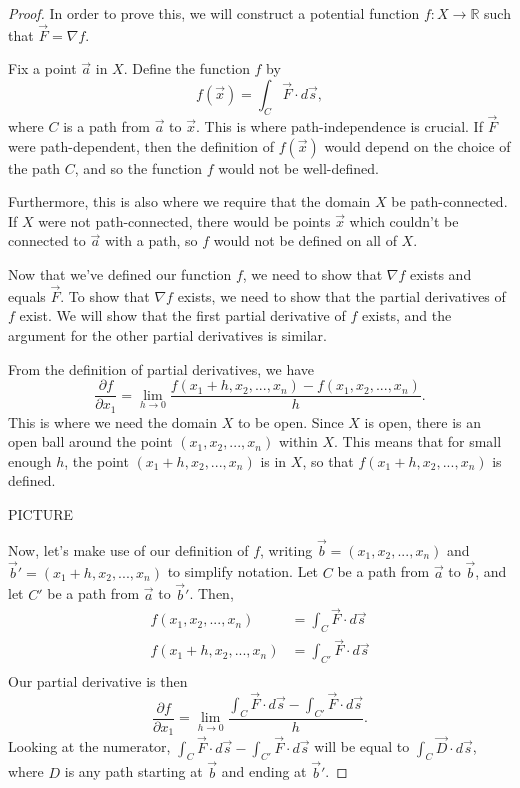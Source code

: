 \documentclass{ximera}
\begin{document}
\begin{proof}
In order to prove this, we will construct a potential function $f:X\rightarrow\mathbb{R}$ such that $\vec{F} = \nabla f$.

Fix a point $\vec{a}$ in $X$. Define the function $f$ by
\[
f(\vec{x}) = \int_C\vec{F}\cdot d\vec{s},
\]
where $C$ is a path from $\vec{a}$ to $\vec{x}$. This is where path-independence is crucial. If $\vec{F}$ were path-dependent, then the definition of $f(\vec{x})$ would depend on the choice of the path $C$, and so the function $f$ would not be well-defined. 

Furthermore, this is also where we require that the domain $X$ be path-connected. If $X$ were not path-connected, there would be points $\vec{x}$ which couldn't be connected to $\vec{a}$ with a path, so $f$ would not be defined on all of $X$.

Now that we've defined our function $f$, we need to show that $\nabla f$ exists and equals $\vec{F}$. To show that $\nabla f$ exists, we need to show that the partial derivatives of $f$ exist. We will show that the first partial derivative of $f$ exists, and the argument for the other partial derivatives is similar.

From the definition of partial derivatives, we have
\[
\frac{\partial f}{\partial x_1} = \lim_{h\rightarrow 0} \frac{f(x_1+h,x_2,...,x_n) - f(x_1,x_2,...,x_n)}{h}.
\]
This is where we need the domain $X$ to be open. Since $X$ is open, there is an open ball around the point $(x_1,x_2,...,x_n)$ within $X$. This means that for small enough $h$, the point $(x_1+h,x_2,...,x_n)$ is in $X$, so that $f(x_1+h,x_2,...,x_n)$ is defined.

PICTURE

Now, let's make use of our definition of $f$, writing $\vec{b} = (x_1,x_2,...,x_n)$ and $\vec{b}' = (x_1+h,x_2,...,x_n)$ to simplify notation. Let $C$ be a path from $\vec{a}$ to $\vec{b}$, and let $C'$ be a path from $\vec{a}$ to $\vec{b}'$. Then,
\begin{align*}
f(x_1,x_2,...,x_n) &= \int_C\vec{F}\cdot d\vec{s}\\
f(x_1+h,x_2,...,x_n) &= \int_{C'}\vec{F}\cdot d\vec{s}\\
\end{align*}
Our partial derivative is then
\[
\frac{\partial f}{\partial x_1} = \lim_{h\rightarrow 0} \frac{\int_C\vec{F}\cdot d\vec{s} - \int_{C'}\vec{F}\cdot d\vec{s}}{h}.
\]
Looking at the numerator, $\int_C\vec{F}\cdot d\vec{s} - \int_{C'}\vec{F}\cdot d\vec{s}$ will be equal to $\int_C\vec{D}\cdot d\vec{s}$, where $D$ is any path starting at $\vec{b}$ and ending at $\vec{b}'$.


\end{proof}
\end{document}
